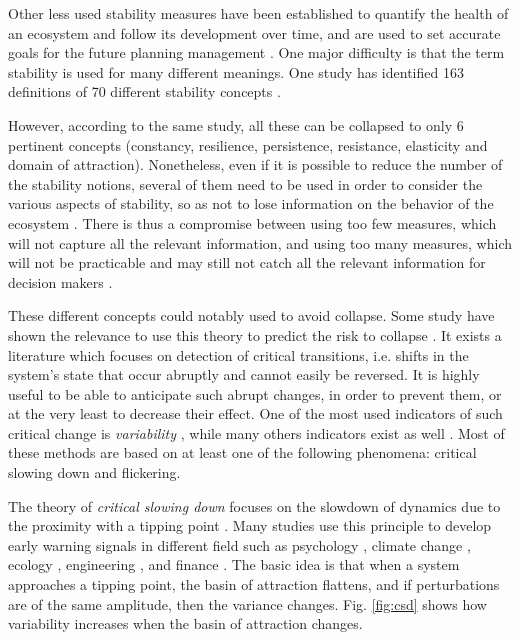 \documentclass{article}
\begin{document}
Other less used stability measures have been established to quantify the health of an ecosystem and follow its development over time, and are used to set accurate goals for the future planning management \citep {donohue_navigating_2016, mayer_strengths_2008}. One major difficulty is that the term stability is used for many different meanings. One study has identified 163 definitions of 70 different stability concepts \citep{grimm_babel_1997}.

However, according to the same study, all these can be collapsed to only 6 pertinent concepts (constancy,  resilience,  persistence,  resistance,  elasticity and domain of attraction). Nonetheless, even if it is possible to reduce the number of the stability notions, several of them need to be used in order to consider the various aspects of stability, so as not to lose information on the behavior of the ecosystem \citep{derissen_relationship_2011}. There is thus a compromise between using too few measures, which will not capture all the relevant information, and using too many measures, which will not be practicable and may still not catch all the relevant information for decision makers \citep{hillebrand_decomposing_2018, donohue_dimensionality_2013}.

\label{def_detection}
These different concepts could notably used to avoid collapse. Some study have shown the relevance to use this theory to predict the risk to collapse \citep{carr_modeling_2012, dai_generic_2012, dai_slower_2013}.
It exists a literature which focuses on detection of critical transitions, i.e. shifts in the system's state that occur abruptly and cannot easily be reversed. It is highly useful to be able to anticipate such abrupt changes, in order to prevent them, or at the very least to decrease their effect. One of the most used indicators of such critical change is \textit{variability} \citep{brock_variance_2006, carpenter2006rising, scheffer2015generic, dakos_robustness_2012, biggs_turning_2009}, while many others indicators exist as well \citep{scheffer_generic_2015,dakos_methods_2012}. Most of these methods are based on at least one of the following phenomena: critical slowing down and flickering.

The theory of \textit{critical slowing down} focuses on the slowdown of dynamics due to the proximity with a tipping point \citep{dakos_critical_2014, dakos_slowing_nodate, scheffer_anticipating_2012}. Many studies use this principle to develop early warning signals in different field such as psychology \citep{van_de_leemput_critical_2014}, climate change \citep{lenton_early_2012}, ecology \citep{chisholm_critical_2009, gandhi_critical_1998},  engineering \citep{ren_early_2015}, and finance \citep{diks_critical_2018}. The basic idea is that when a system approaches a tipping point, the basin of attraction flattens, and if perturbations are of the same amplitude, then the variance changes. Fig. \ref{fig:csd} shows how variability increases when the basin of attraction changes.
\end{document}
